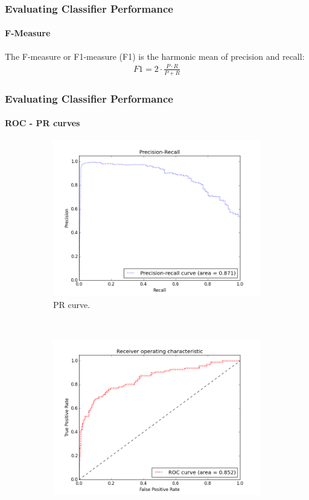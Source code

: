 \documentclass{beamer}
\begin{document}
\begin{frame}[noframenumbering]
    \frametitle{Evaluating Classifier Performance}  %
    \framesubtitle{F-Measure}
    The F-measure or F1-measure (F1) is the harmonic mean of precision and recall:
    \begin{equation}
    \label{eq:fmes}
    \begin{aligned}
    F1 = 2\cdot \frac{P \cdot R}{P+R}
    \end{aligned}
    \end{equation}
\end{frame}
\begin{frame}[noframenumbering]
    \frametitle{Evaluating Classifier Performance}  %
    \framesubtitle{ROC - PR curves}
    \begin{figure}[!htb]
        \centering
        \begin{subfigure}[t]{0.5\textwidth}
            \centering
            \includegraphics[width=\textwidth]{fig/Psv_1_2_fine_PR}
            \caption{PR curve.}
        \end{subfigure}%
        ~
        \begin{subfigure}[t]{0.5\textwidth}
            \centering
            \includegraphics[width=\textwidth]{fig/Psv_1_2_fine_ROC}

\end{subfigure}
\end{figure}
\end{frame}
\end{document}
